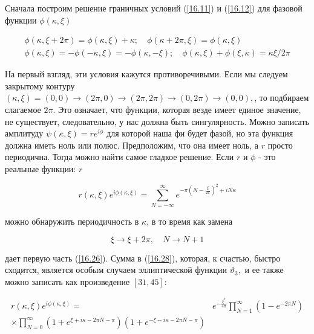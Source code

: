 \documentclass[main.tex]{subfiles}
\begin{document}
Сначала построим решение граничных условий (\ref{16.11}) и (\ref{16.12}) для фазовой функции $\phi(\kappa, \xi)$

\begin{equation}\label{16.26} 
\begin{array}{l}
{\phi(\kappa, \xi+2 \pi)=\phi(\kappa, \xi)+\kappa ; \quad \phi(\kappa+2 \pi, \xi)=\phi(\kappa, \xi)} \\
{\phi(\kappa, \xi)=-\phi(-\kappa, \xi)=-\phi(\kappa,-\xi) ; \quad \phi(\kappa, \xi)+\phi(\xi, \kappa)=\kappa \xi / 2 \pi}
\end{array}
\end{equation}

На первый взгляд, эти условия кажутся противоречивыми. Если мы следуем закрытому контуру $(\kappa, \xi)=(0,0) \rightarrow(2 \pi, 0) \rightarrow(2 \pi, 2 \pi) \rightarrow(0,2 \pi) \rightarrow(0,0),$, то подбираем слагаемое $2 \pi .$ Это означает, что функции, которая везде имеет единое значение, не существует, следовательно, у нас должна быть сингулярность. Можно записать амплитуду $\psi(\kappa, \xi)=r e^{i \phi}$ для которой наша фи будет фазой, но эта функция должна иметь ноль или полюс. Предположим, что она имеет ноль, а $r$ просто периодична. Тогда можно найти самое гладкое решение. Если $r$ и $\phi$ - это реальные функции:
$r$

\begin{equation}\label{16.28} 
r(\kappa, \xi) e^{i \phi(\kappa, \xi)}=\sum_{N=-\infty}^{\infty} e^{-\pi\left(N-\frac{\xi}{2 \pi}\right)^{2}+i N \kappa}
\end{equation}

можно обнаружить периодичность в $\kappa$, в то время как замена

\begin{equation}\label{16.29} 
\xi \rightarrow \xi+2 \pi, \quad N \rightarrow N+1
\end{equation}

дает первую часть (\ref{16.26}). Сумма в (\ref{16.28}), которая, к счастью, быстро сходится, является особым случаем эллиптической функции $\vartheta_{3},$ и ее также можно записать как произведение $[31,45]:$

\begin{equation}\label{16.30} 
\begin{aligned}
r(\kappa, \xi) e^{i \phi(\kappa, \xi)}=& e^{-\frac{\xi^{2}}{4 \pi}} \prod_{N=1}^{\infty}\left(1-e^{-2 \pi N}\right) \\
\times \prod_{N=0}^{\infty}\left(1+e^{\xi+i \kappa-2 \pi N-\pi}\right)\left(1+e^{-\xi-i \kappa-2 \pi N-\pi}\right) &
\end{aligned}
\end{equation}
\end{document}

